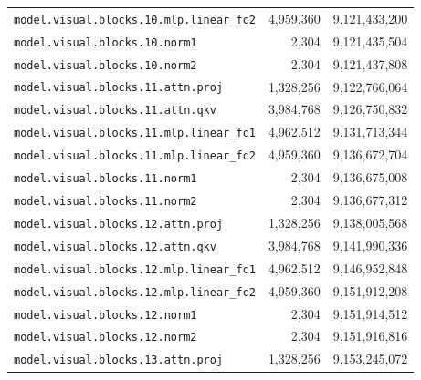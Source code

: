 \documentclass[10pt,a4paper]{article}
\theoremstyle{definition}
\begin{document}
\begin{appendices}
\begin{longtable}{p{9.5cm}rr}
\texttt{model.\allowbreak{}visual.\allowbreak{}blocks.\allowbreak{}10.\allowbreak{}mlp.\allowbreak{}linear\_fc2} & 4,959,360 & 9,121,433,200 \\
\texttt{model.\allowbreak{}visual.\allowbreak{}blocks.\allowbreak{}10.\allowbreak{}norm1} & 2,304 & 9,121,435,504 \\
\texttt{model.\allowbreak{}visual.\allowbreak{}blocks.\allowbreak{}10.\allowbreak{}norm2} & 2,304 & 9,121,437,808 \\
\texttt{model.\allowbreak{}visual.\allowbreak{}blocks.\allowbreak{}11.\allowbreak{}attn.\allowbreak{}proj} & 1,328,256 & 9,122,766,064 \\
\texttt{model.\allowbreak{}visual.\allowbreak{}blocks.\allowbreak{}11.\allowbreak{}attn.\allowbreak{}qkv} & 3,984,768 & 9,126,750,832 \\
\texttt{model.\allowbreak{}visual.\allowbreak{}blocks.\allowbreak{}11.\allowbreak{}mlp.\allowbreak{}linear\_fc1} & 4,962,512 & 9,131,713,344 \\
\texttt{model.\allowbreak{}visual.\allowbreak{}blocks.\allowbreak{}11.\allowbreak{}mlp.\allowbreak{}linear\_fc2} & 4,959,360 & 9,136,672,704 \\
\texttt{model.\allowbreak{}visual.\allowbreak{}blocks.\allowbreak{}11.\allowbreak{}norm1} & 2,304 & 9,136,675,008 \\
\texttt{model.\allowbreak{}visual.\allowbreak{}blocks.\allowbreak{}11.\allowbreak{}norm2} & 2,304 & 9,136,677,312 \\
\texttt{model.\allowbreak{}visual.\allowbreak{}blocks.\allowbreak{}12.\allowbreak{}attn.\allowbreak{}proj} & 1,328,256 & 9,138,005,568 \\
\texttt{model.\allowbreak{}visual.\allowbreak{}blocks.\allowbreak{}12.\allowbreak{}attn.\allowbreak{}qkv} & 3,984,768 & 9,141,990,336 \\
\texttt{model.\allowbreak{}visual.\allowbreak{}blocks.\allowbreak{}12.\allowbreak{}mlp.\allowbreak{}linear\_fc1} & 4,962,512 & 9,146,952,848 \\
\texttt{model.\allowbreak{}visual.\allowbreak{}blocks.\allowbreak{}12.\allowbreak{}mlp.\allowbreak{}linear\_fc2} & 4,959,360 & 9,151,912,208 \\
\texttt{model.\allowbreak{}visual.\allowbreak{}blocks.\allowbreak{}12.\allowbreak{}norm1} & 2,304 & 9,151,914,512 \\
\texttt{model.\allowbreak{}visual.\allowbreak{}blocks.\allowbreak{}12.\allowbreak{}norm2} & 2,304 & 9,151,916,816 \\
\texttt{model.\allowbreak{}visual.\allowbreak{}blocks.\allowbreak{}13.\allowbreak{}attn.\allowbreak{}proj} & 1,328,256 & 9,153,245,072 \\

\end{longtable}
\end{appendices}
\end{document}
